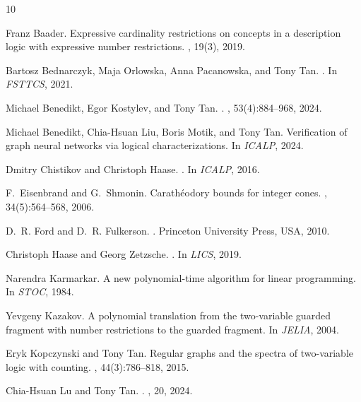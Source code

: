 \documentclass[10pt,a4paper]{article}
\theoremstyle{definition}
\theoremstyle{remark}
\begin{document}
\begin{thebibliography}{10}

Franz Baader.
\newblock Expressive cardinality restrictions on concepts in a description logic with expressive number restrictions.
, 19(3), 2019.

Bartosz Bednarczyk, Maja Orlowska, Anna Pacanowska, and Tony Tan.
.
\newblock In {\em FSTTCS}, 2021.

Michael Benedikt, Egor Kostylev, and Tony Tan.
.
, 53(4):884--968, 2024.

Michael Benedikt, Chia-Hsuan Liu, Boris Motik, and Tony Tan.
\newblock Verification of graph neural networks via logical characterizations.
\newblock In {\em ICALP}, 2024.

Dmitry Chistikov and Christoph Haase.
.
\newblock In {\em ICALP}, 2016.

F.~Eisenbrand and G.~Shmonin.
\newblock Carath{\'{e}}odory bounds for integer cones.
, 34(5):564--568, 2006.

D.~R. Ford and D.~R. Fulkerson.
.
\newblock Princeton University Press, USA, 2010.

Christoph Haase and Georg Zetzsche.
.
\newblock In {\em {LICS}}, 2019.

Narendra Karmarkar.
\newblock A new polynomial-time algorithm for linear programming.
\newblock In {\em STOC}, 1984.

Yevgeny Kazakov.
\newblock A polynomial translation from the two-variable guarded fragment with number restrictions to the guarded fragment.
\newblock In {\em {JELIA}}, 2004.

Eryk Kopczynski and Tony Tan.
\newblock Regular graphs and the spectra of two-variable logic with counting.
, 44(3):786--818, 2015.

Chia{-}Hsuan Lu and Tony Tan.
.
, 20, 2024.


\end{thebibliography}
\end{document}
